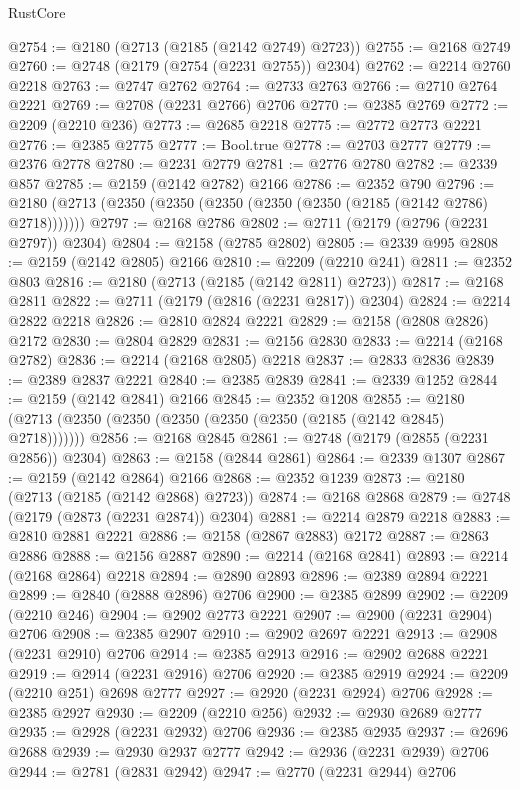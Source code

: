 \begin{lexlean}{RustCore}
\begin{coremodule}
@2754 := @2180 (@2713 (@2185 (@2142 @2749) @2723))
@2755 := @2168 @2749
@2760 := @2748 (@2179 (@2754 (@2231 @2755)) @2304)
@2762 := @2214 @2760 @2218
@2763 := @2747 @2762
@2764 := @2733 @2763
@2766 := @2710 @2764 @2221
@2769 := @2708 (@2231 @2766) @2706
@2770 := @2385 @2769
@2772 := @2209 (@2210 @236)
@2773 := @2685 @2218
@2775 := @2772 @2773 @2221
@2776 := @2385 @2775
@2777 := Bool.true
@2778 := @2703 @2777
@2779 := @2376 @2778
@2780 := @2231 @2779
@2781 := @2776 @2780
@2782 := @2339 @857
@2785 := @2159 (@2142 @2782) @2166
@2786 := @2352 @790
@2796 := @2180 (@2713 (@2350 (@2350 (@2350 (@2350 (@2350 (@2185 (@2142 @2786) @2718)))))))
@2797 := @2168 @2786
@2802 := @2711 (@2179 (@2796 (@2231 @2797)) @2304)
@2804 := @2158 (@2785 @2802)
@2805 := @2339 @995
@2808 := @2159 (@2142 @2805) @2166
@2810 := @2209 (@2210 @241)
@2811 := @2352 @803
@2816 := @2180 (@2713 (@2185 (@2142 @2811) @2723))
@2817 := @2168 @2811
@2822 := @2711 (@2179 (@2816 (@2231 @2817)) @2304)
@2824 := @2214 @2822 @2218
@2826 := @2810 @2824 @2221
@2829 := @2158 (@2808 @2826) @2172
@2830 := @2804 @2829
@2831 := @2156 @2830
@2833 := @2214 (@2168 @2782)
@2836 := @2214 (@2168 @2805) @2218
@2837 := @2833 @2836
@2839 := @2389 @2837 @2221
@2840 := @2385 @2839
@2841 := @2339 @1252
@2844 := @2159 (@2142 @2841) @2166
@2845 := @2352 @1208
@2855 := @2180 (@2713 (@2350 (@2350 (@2350 (@2350 (@2350 (@2185 (@2142 @2845) @2718)))))))
@2856 := @2168 @2845
@2861 := @2748 (@2179 (@2855 (@2231 @2856)) @2304)
@2863 := @2158 (@2844 @2861)
@2864 := @2339 @1307
@2867 := @2159 (@2142 @2864) @2166
@2868 := @2352 @1239
@2873 := @2180 (@2713 (@2185 (@2142 @2868) @2723))
@2874 := @2168 @2868
@2879 := @2748 (@2179 (@2873 (@2231 @2874)) @2304)
@2881 := @2214 @2879 @2218
@2883 := @2810 @2881 @2221
@2886 := @2158 (@2867 @2883) @2172
@2887 := @2863 @2886
@2888 := @2156 @2887
@2890 := @2214 (@2168 @2841)
@2893 := @2214 (@2168 @2864) @2218
@2894 := @2890 @2893
@2896 := @2389 @2894 @2221
@2899 := @2840 (@2888 @2896) @2706
@2900 := @2385 @2899
@2902 := @2209 (@2210 @246)
@2904 := @2902 @2773 @2221
@2907 := @2900 (@2231 @2904) @2706
@2908 := @2385 @2907
@2910 := @2902 @2697 @2221
@2913 := @2908 (@2231 @2910) @2706
@2914 := @2385 @2913
@2916 := @2902 @2688 @2221
@2919 := @2914 (@2231 @2916) @2706
@2920 := @2385 @2919
@2924 := @2209 (@2210 @251) @2698 @2777
@2927 := @2920 (@2231 @2924) @2706
@2928 := @2385 @2927
@2930 := @2209 (@2210 @256)
@2932 := @2930 @2689 @2777
@2935 := @2928 (@2231 @2932) @2706
@2936 := @2385 @2935
@2937 := @2696 @2688
@2939 := @2930 @2937 @2777
@2942 := @2936 (@2231 @2939) @2706
@2944 := @2781 (@2831 @2942)
@2947 := @2770 (@2231 @2944) @2706

\end{coremodule}
\end{lexlean}
